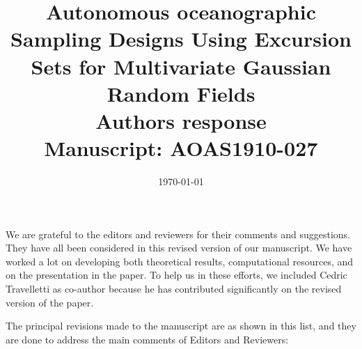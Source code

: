 \documentclass[a4paper]{article}
\newcounter{reviewer}
\begin{document}
\title{Autonomous oceanographic Sampling Designs Using Excursion Sets for Multivariate Gaussian Random Fields
  \\\vspace{5mm}
 Authors response
  \\\vspace{5mm}
\small{Manuscript: AOAS1910-027}}
\author{ }

\date{\today}

\maketitle

We are grateful to the editors and reviewers for their comments and
suggestions. They have all been considered in this revised
version of our manuscript. We have worked a lot on developing both theoretical results, computational resources, and on the presentation in the paper. To help us in these efforts, we included Cedric Travelletti as co-author because he has contributed significantly on the revised version of the paper. 

The principal revisions made to the manuscript are as shown in this list, and they are done to address the main comments of Editors and Reviewers:
\end{document}
